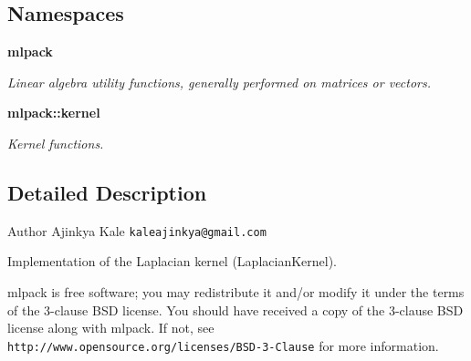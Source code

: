 \subsection*{Namespaces}
\begin{DoxyCompactItemize}
\item 
 \textbf{ mlpack}
\begin{DoxyCompactList}\small\item\em Linear algebra utility functions, generally performed on matrices or vectors. \end{DoxyCompactList}\item 
 \textbf{ mlpack\+::kernel}
\begin{DoxyCompactList}\small\item\em Kernel functions. \end{DoxyCompactList}\end{DoxyCompactItemize}


\subsection{Detailed Description}
\begin{DoxyAuthor}{Author}
Ajinkya Kale {\tt kaleajinkya@gmail.\+com}
\end{DoxyAuthor}
Implementation of the Laplacian kernel (Laplacian\+Kernel).

mlpack is free software; you may redistribute it and/or modify it under the terms of the 3-\/clause B\+SD license. You should have received a copy of the 3-\/clause B\+SD license along with mlpack. If not, see {\tt http\+://www.\+opensource.\+org/licenses/\+B\+S\+D-\/3-\/\+Clause} for more information. 
